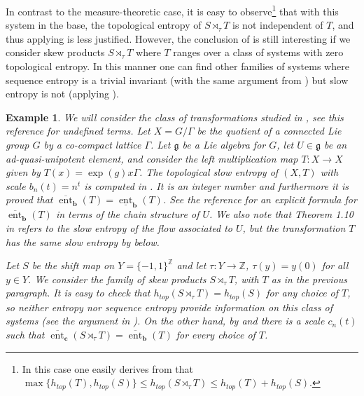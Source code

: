 \documentclass[a4paper,oneside]{amsart}
\renewcommand{\(}{\begin{dmath*}}
\renewcommand{\)}{\end{dmath*}}
\newtheorem{example}[theorem]{Example}
\theoremstyle{definition}
\newcommand{\Z}{\mathbb{Z}}
\newcommand{\upperent}{\overline{\operatorname{ent}}}
\newcommand{\lowerent}{\underline{\operatorname{ent}}}
\begin{document}
In contrast to the measure-theoretic case, it is easy to observe\footnote{In this case one easily derives from  that $\max\{h_{top}(T),h_{top}(S)\}\leq h_{top}(S\rtimes_\tau T)\leq h_{top}(T)+h_{top}(S)$.} that with this system in the base, the topological entropy of $S\rtimes_\tau T$ is not independent of $T$, and thus applying  is less justified. However, the conclusion of  is still interesting if we consider skew products $S\rtimes_\tau T$ where  $T$ ranges over a class of systems with zero topological entropy. In this manner one can find other families of systems where sequence entropy is a trivial invariant (with the same argument from ) but slow entropy is not (applying ).
\begin{example}
We will consider the class of transformations studied in \cite{kanigowski_slow_2019}, see this reference for undefined terms. Let $X=G/\Gamma$ be the quotient of a connected Lie group $G$ by a co-compact lattice $\Gamma$. Let $\mathfrak{g}$ be a Lie algebra for $G$, let $U\in\mathfrak{g}$ be an ad-quasi-unipotent element, and consider the left multiplication map $T\colon X\to X$ given by  $T(x)=\exp(g)x\Gamma$. The topological slow entropy of $(X,T)$ with scale $b_n(t)=n^t$ is computed in \cite[Theorem 1.10]{kanigowski_slow_2019}. It is an integer number and furthermore it is proved that $\upperent_{\textbf{b}}(T)=\lowerent_{\textbf{b}}(T)$. See the reference for an explicit formula for $\upperent_{\textbf{b}}(T)$ in terms of the chain structure of $U$. We also note that Theorem 1.10 in \cite{kanigowski_slow_2019} refers to the slow entropy of the flow associated to $U$, but the  transformation $T$ has the same slow entropy by  below. 

   Let $S$ be the shift map on $Y=\{-1,1\}^\Z$ and let $\tau\colon Y\to\Z$, $\tau(y)=y(0)$ for all $y\in Y$. We consider the family of skew products $S\rtimes_\tau T$, with $T$ as in the previous paragraph. It is easy to check that $h_{top}(S\rtimes_\tau T)=h_{top}(S)$ for any choice of $T$, so neither entropy nor sequence entropy provide information on this class of systems (see the argument in ). On the other hand, by  and  there is a scale $c_n(t)$ such that $\upperent_{\textbf{c}}(S\rtimes_\tau T)=\upperent_{\textbf{b}}(T)$ for every choice of $T$.   
\end{example}
\end{document}

